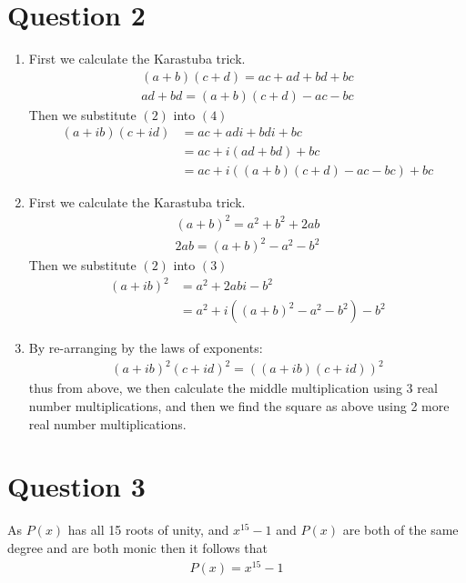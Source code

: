 \documentclass{article}
\begin{document}
\section*{Question 2}
\begin{enumerate}[label=\alph*)]
    \item
        First we calculate the Karastuba trick.
        \setcounter{equation}{0}
        \begin{gather}
            (a + b)(c + d) = ac + ad + bd + bc \\
            ad + bd = (a + b)(c + d) - ac - bc
        \end{gather}
        Then we substitute $(2)$ into $(4)$
        \begin{align}
            (a + ib)(c + id) &= ac + adi + bdi + bc \\
            &= ac + i(ad + bd) + bc \\
            &= ac + i((a + b)(c + d) - ac - bc) + bc
        \end{align}
    \item
        \setcounter{equation}{0}
        First we calculate the Karastuba trick.
        \begin{gather}
            (a + b)^2 = a^2 + b^2 + 2ab \\
            2ab = (a + b)^2 - a^2 - b^2
        \end{gather}
        Then we substitute $(2)$ into $(3)$
        \begin{align}
            (a + ib)^2 &= a^2 + 2abi - b^2 \\
            &= a^2 + i((a + b)^2 - a^2 - b^2) - b^2
        \end{align}
    \item
        \setcounter{equation}{0}
        By re-arranging by the laws of exponents:
        \begin{gather*}
            (a+ib)^2(c+id)^2 = ((a+ib)(c+id))^2
        \end{gather*}
        thus from above, we then calculate the middle multiplication using
        3 real number multiplications, and then we find the square as above
        using 2 more real number multiplications.
\end{enumerate}

\section*{Question 3}
As $P(x)$ has all 15 roots of unity, and $x^{15} - 1$ and $P(x)$ are both of the same degree and are both monic then it follows that
\begin{gather*}
P(x) = x^{15} -1
\end{gather*}
\end{document}
